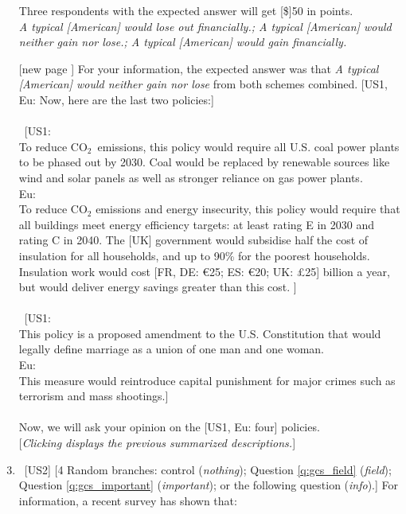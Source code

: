 \begin{enumerate}[resume]
Three respondents with the expected answer will get [\$]50 in points.
\\ \textit{A typical [American] would lose out financially.; A typical [American] would neither gain nor lose.; A typical [American] would gain financially.}
\item[[new page\!\!\!]] For your information, the expected answer was that \textit{A typical [American] would neither gain nor lose} from both schemes combined. [US1, Eu: Now, here are the last two policies:]~ \\
\\
~[US1: \textbf{} \\To reduce CO$_\text{2}$~emissions, this policy would require all U.S. coal power plants to be phased out by 2030. Coal would be replaced by renewable sources like wind and solar panels as well as stronger reliance on gas power plants.\\
Eu: \textbf{}\\ To reduce CO$_\text{2}$ emissions and energy insecurity, this policy would require that all buildings meet energy efficiency targets: at least rating E in 2030 and rating C in 2040. 
The [UK] government would subsidise half the cost of insulation for all households, and up to 90\% for the poorest households. Insulation work would cost [FR, DE: \euro{}25; ES: \euro{}20; UK: £25] billion a year, but would deliver energy savings greater than this cost.
]~\\
\\
~[US1: \textbf{}\\
This policy is a proposed amendment to the U.S. Constitution that would legally define marriage as a union of one man and one woman. \\
Eu: \textbf{} \\This measure would reintroduce capital punishment for major crimes such as terrorism and mass shootings.]~\\
\\
Now, we will ask your opinion on the [US1, Eu: four] policies.\\
 [\textit{Clicking displays the previous summarized descriptions.}]
\item ~[US2] [4 Random branches: control (\textit{nothing}); Question \ref{q:gcs_field} (\textit{field}); Question \ref{q:gcs_important} (\textit{important}); or the following question (\textit{info}).] \label{q:info_support} For information, a recent survey has shown that:

\end{enumerate}
